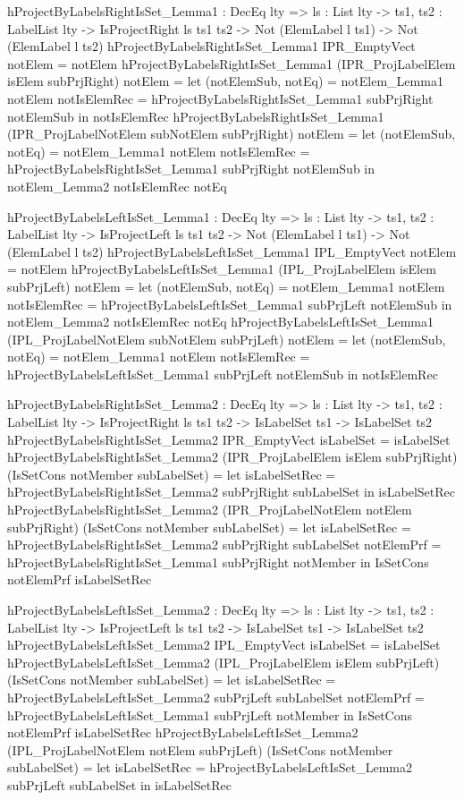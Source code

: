 \begin{code}
hProjectByLabelsRightIsSet_Lemma1 : DecEq lty => {ls : List lty} -> 
  {ts1, ts2 : LabelList lty} -> IsProjectRight ls ts1 ts2 -> 
  Not (ElemLabel l ts1) -> Not (ElemLabel l ts2)
hProjectByLabelsRightIsSet_Lemma1 IPR_EmptyVect notElem = notElem
hProjectByLabelsRightIsSet_Lemma1 
  (IPR_ProjLabelElem isElem subPrjRight) notElem = 
  let
    (notElemSub, notEq) = notElem_Lemma1 notElem
    notIsElemRec = 
      hProjectByLabelsRightIsSet_Lemma1 subPrjRight notElemSub
  in notIsElemRec
hProjectByLabelsRightIsSet_Lemma1 
  (IPR_ProjLabelNotElem subNotElem subPrjRight) notElem = 
  let
    (notElemSub, notEq) = notElem_Lemma1 notElem
    notIsElemRec = 
      hProjectByLabelsRightIsSet_Lemma1 subPrjRight notElemSub
  in notElem_Lemma2 notIsElemRec notEq

hProjectByLabelsLeftIsSet_Lemma1 : DecEq lty => {ls : List lty} -> 
  {ts1, ts2 : LabelList lty} -> IsProjectLeft ls ts1 ts2 -> 
  Not (ElemLabel l ts1) -> Not (ElemLabel l ts2)
hProjectByLabelsLeftIsSet_Lemma1 IPL_EmptyVect notElem = notElem
hProjectByLabelsLeftIsSet_Lemma1 
  (IPL_ProjLabelElem isElem subPrjLeft) notElem = 
  let
    (notElemSub, notEq) = notElem_Lemma1 notElem
    notIsElemRec = 
      hProjectByLabelsLeftIsSet_Lemma1 subPrjLeft notElemSub
  in notElem_Lemma2 notIsElemRec notEq  
hProjectByLabelsLeftIsSet_Lemma1 
  (IPL_ProjLabelNotElem subNotElem subPrjLeft) notElem =
  let
    (notElemSub, notEq) = notElem_Lemma1 notElem
    notIsElemRec = 
      hProjectByLabelsLeftIsSet_Lemma1 subPrjLeft notElemSub
  in notIsElemRec

hProjectByLabelsRightIsSet_Lemma2 : DecEq lty => {ls : List lty} -> 
  {ts1, ts2 : LabelList lty} -> IsProjectRight ls ts1 ts2 -> 
  IsLabelSet ts1 -> IsLabelSet ts2      
hProjectByLabelsRightIsSet_Lemma2 IPR_EmptyVect isLabelSet = 
  isLabelSet         
hProjectByLabelsRightIsSet_Lemma2 
  (IPR_ProjLabelElem isElem subPrjRight) 
  (IsSetCons notMember subLabelSet) =
  let isLabelSetRec = 
    hProjectByLabelsRightIsSet_Lemma2 subPrjRight subLabelSet
  in isLabelSetRec 
hProjectByLabelsRightIsSet_Lemma2 
  (IPR_ProjLabelNotElem notElem subPrjRight) 
  (IsSetCons notMember subLabelSet) = 
  let isLabelSetRec = 
        hProjectByLabelsRightIsSet_Lemma2 subPrjRight subLabelSet
      notElemPrf = 
        hProjectByLabelsRightIsSet_Lemma1 subPrjRight notMember 
  in IsSetCons notElemPrf isLabelSetRec

hProjectByLabelsLeftIsSet_Lemma2 : DecEq lty => {ls : List lty} -> 
  {ts1, ts2 : LabelList lty} -> IsProjectLeft ls ts1 ts2 -> 
  IsLabelSet ts1 -> IsLabelSet ts2
hProjectByLabelsLeftIsSet_Lemma2 IPL_EmptyVect isLabelSet = 
  isLabelSet
hProjectByLabelsLeftIsSet_Lemma2 
  (IPL_ProjLabelElem isElem subPrjLeft) 
  (IsSetCons notMember subLabelSet) = 
  let isLabelSetRec = 
        hProjectByLabelsLeftIsSet_Lemma2 subPrjLeft subLabelSet
      notElemPrf = 
        hProjectByLabelsLeftIsSet_Lemma1 subPrjLeft notMember
  in IsSetCons notElemPrf isLabelSetRec
hProjectByLabelsLeftIsSet_Lemma2 
  (IPL_ProjLabelNotElem notElem subPrjLeft) 
  (IsSetCons notMember subLabelSet) = 
  let isLabelSetRec = 
        hProjectByLabelsLeftIsSet_Lemma2 subPrjLeft subLabelSet
  in isLabelSetRec 
    

\end{code}
